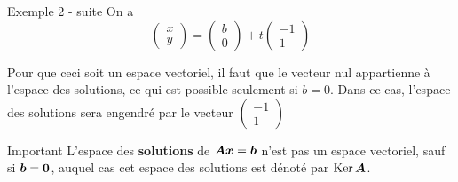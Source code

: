\documentclass[french, handout]{beamer}
\begin{document}
\begin{frame}{Exemple 2 - suite}
On a
\[
\begin{pmatrix}
x \\ y
\end{pmatrix}
= 
\begin{pmatrix}
b\\0
\end{pmatrix}
+ t\begin{pmatrix}
-1 \\ 1
\end{pmatrix}
\]

Pour que ceci soit un espace vectoriel, il faut que le vecteur nul appartienne à l'espace des solutions, 
ce qui est possible seulement si $b=0$.  Dans ce cas, l'espace des solutions sera engendré par le vecteur
$\displaystyle
\begin{pmatrix}
-1 \\ 1
\end{pmatrix}
$

\begin{block}{Important}
L'espace des \textbf{solutions} de $\boldsymbol{A}\boldsymbol{x} = \boldsymbol{b}$ n'est
pas un espace vectoriel, sauf si $\boldsymbol{b}=\boldsymbol{0}$, auquel
cas cet espace des solutions est dénoté par
 $\operatorname{Ker}\boldsymbol{A}$.
\end{block}

\end{frame}
\end{document}
